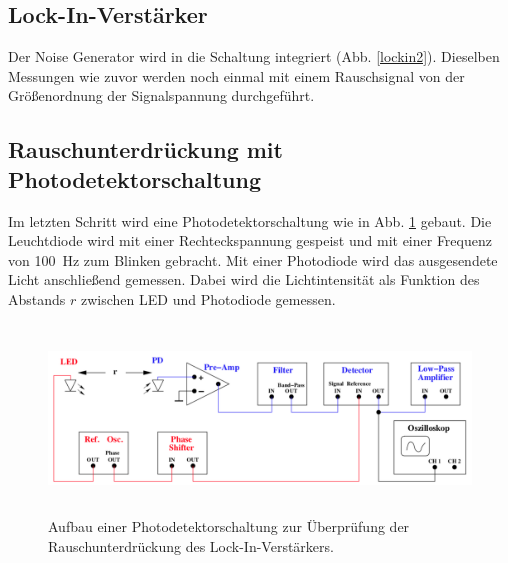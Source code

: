 \subsection{Lock-In-Verstärker} %
\label{sec:zwei}
Der Noise Generator wird in die Schaltung integriert (Abb. \ref{lockin2}).
Dieselben Messungen wie zuvor werden noch einmal mit einem Rauschsignal von der Größenordnung der Signalspannung 
durchgeführt.

\subsection{Rauschunterdrückung mit Photodetektorschaltung} %
Im letzten Schritt wird eine Photodetektorschaltung wie in Abb. \ref{lockin3} gebaut.
Die Leuchtdiode wird mit einer Rechteckspannung gespeist und mit einer Frequenz von \SI{100}{\hertz} zum Blinken gebracht.
Mit einer Photodiode wird das ausgesendete Licht anschließend gemessen.
Dabei wird die Lichtintensität als Funktion des Abstands $r$ zwischen LED und Photodiode gemessen.
\begin{figure}
    \centering
    \includegraphics[width=12cm, height=5cm]{build/lockin3.png}
    \caption{Aufbau einer Photodetektorschaltung zur Überprüfung der
    Rauschunterdrückung des Lock-In-Verstärkers.}
    \label{lockin3}
\end{figure}
